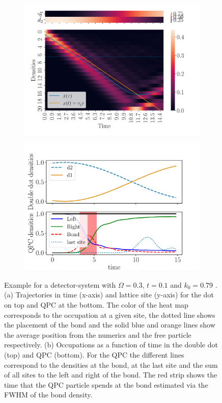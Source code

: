\documentclass{article}
\begin{document}
\begin{figure}[h]
    \centering
    \begin{subfigure}[b]{0.55\textwidth}
        \includegraphics[width=\textwidth]{figures/report_04_2025/traject_ex.png}
        \caption{}
    \end{subfigure}
    \hspace{0.001\textwidth}
    \begin{subfigure}[b]{0.4\textwidth}
        \includegraphics[width=\textwidth]{figures/report_04_2025/densities_ex.pdf}
        \caption{}
    \end{subfigure}
    \caption{Example for a detector-system with $\Omega=0.3$, $t=0.1$ and $k_0=0.79$ . 
    (a) Trajectories in
    time (x-axis) and lattice site (y-axis) for the dot on top and QPC at the bottom. 
    The color of the heat map corresponds to the
    occupation at a given site, the dotted line shows the placement of the bond and the
    solid blue and orange lines show the average position from the numerics and the free particle
    respectively. (b) Occupations as a function of time in the double dot (top) and QPC (bottom).
    For the QPC the different lines correspond to the densities at the bond, at the last site and
    the sum of all sites to the left and right of the bond. The red strip shows the time that 
    the QPC particle spends at the bond estimated via the FWHM of the bond density.}
    \label{fig:trajectory_example}
\end{figure}
\end{document}
